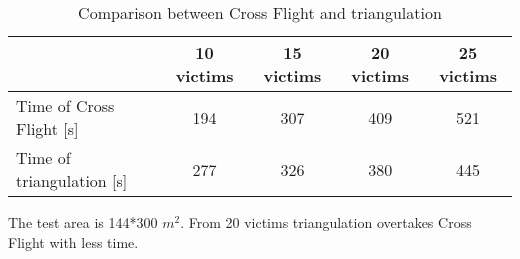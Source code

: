 \documentclass[conference]{IEEEtran}
\begin{document}
\begin{appendices}
\begin{table}[htbp!]
\caption{Comparison between Cross Flight and triangulation}
    \centering
    \resizebox{9.1cm}{!}
    {
    \begin{tabular}{ |l|c|c|c|c| }
    \hline
     & 10 victims & 15 victims & 20 victims & 25 victims \\ \hline
     Time of Cross Flight [s] & 194 & 307 & 409 & 521 \\ \hline
     Time of triangulation [s] & 277 & 326 & 380 & 445 \\ \hline
    \end{tabular}
    }
    \label{tab:comparison cross tri}
\end{table}

The test area is 144*300 $m^2$. From 20 victims triangulation overtakes Cross Flight with less time.


\end{appendices}
\end{document}
